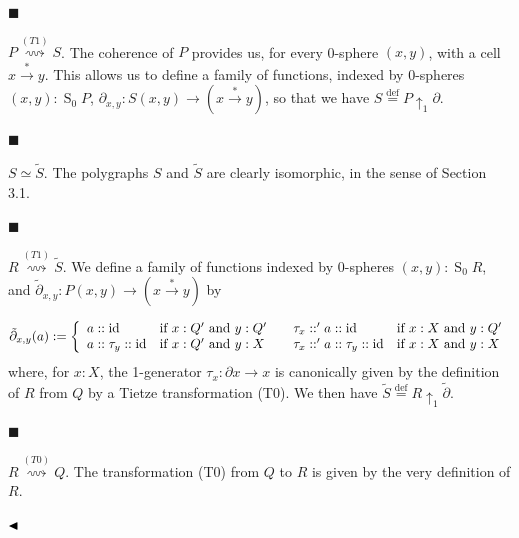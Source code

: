 \par\noindent  $\blacksquare$ 
 
$P\overset{(T1)}{\rightsquigarrow}S$. The coherence of $P$ provides us, for every 0-sphere $(x,y)$, with a cell $x\overset{*}{\to}y$. This allows us to define a family of functions, indexed by 0-spheres $(x,y):\operatorname{S}_{0}P$, $\partial_{x,y}:S(x,y)\to(x\overset{*}{\to}y)$, so that we have $S\overset{\text{def}}{=}P{\uparrow_{1}}\partial$.\par
 
 
 
\par\noindent  $\blacksquare$ 
 
$S\simeq\tilde{S}$. The polygraphs $S$ and $\tilde{S}$ are clearly isomorphic, in the sense of Section 3.1.\par
 
 
 
\par\noindent  $\blacksquare$ 
 
$R\overset{(T1)}{\rightsquigarrow}\tilde{S}$. We define a family of functions indexed by 0-spheres $(x,y):\operatorname{S}_{0}R$, and $\tilde{\partial}_{x,y}:P(x,y)\to(x\overset{*}{\to}y)$ by\par
    \[\tilde{\partial}_{x,y}(a):=\left\{\begin{array}[]{l@{\quad}l@{\qquad}l@{\quad}l}a::\operatorname{id}&\text{if $x:Q^{\prime}$ and $y:Q^{\prime}$}&\tau_{x}::^{\prime}a::\operatorname{id}&\text{if $x:X$ and $y:Q^{\prime}$}\\
a::\tau_{y}::\operatorname{id}&\text{if $x:Q^{\prime}$ and $y:X$}&\tau_{x}::^{\prime}a::\tau_{y}::\operatorname{id}&\text{if $x:X$ and $y:X$}\end{array}\right.\]    
where, for $x:X$, the 1-generator $\tau_{x}:\partial x\to x$ is canonically given by the definition of $R$ from $Q$ by a Tietze transformation (T0). We then have $\tilde{S}\overset{\text{def}}{=}R{\uparrow_{1}}\tilde{\partial}$.\par
 
 
 
\par\noindent  $\blacksquare$ 
 
$R\overset{(T0)}{\rightsquigarrow}Q$. The transformation (T0) from $Q$ to $R$ is given by the very definition of $R$.\par
 
 
  
$\hfill\blacktriangleleft$\par
 
 
 
 
